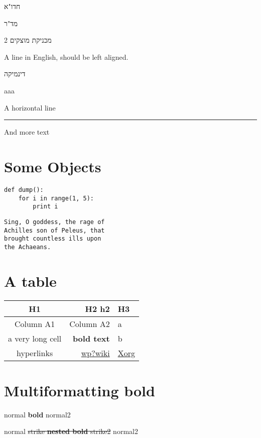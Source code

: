 חדו"א

מד"ר

מכניקת מוצקים 2

A line in English, should be left aligned.

דינמיקה



aaa





A horizontal line


\hrule


And more text





\section{Some Objects}



\begin{lstlisting}
def dump():
	for i in range(1, 5):
		print i

\end{lstlisting}





\begin{lstlisting}
Sing, O goddess, the rage of
Achilles son of Peleus, that
brought countless ills upon
the Achaeans.

\end{lstlisting}


\section{A table}


\begin{tabular}{ |c|r|l| }
\hline
 H1 & H2 h2 & H3 \tabularnewline
\hline
\hline
 Column A1 & Column A2 & a \tabularnewline
\hline
 a very long cell & \textbf{bold text} & b \tabularnewline
\hline
 hyperlinks & \href{interwiki:wp?wiki}{wp?wiki} & \href{http://x.org}{Xorg} \tabularnewline
\hline
\end{tabular}


\section{Multiformatting \textbf{bold}}


normal \textbf{bold} normal2

normal \sout{strike \textbf{nested bold} strike2} normal2

